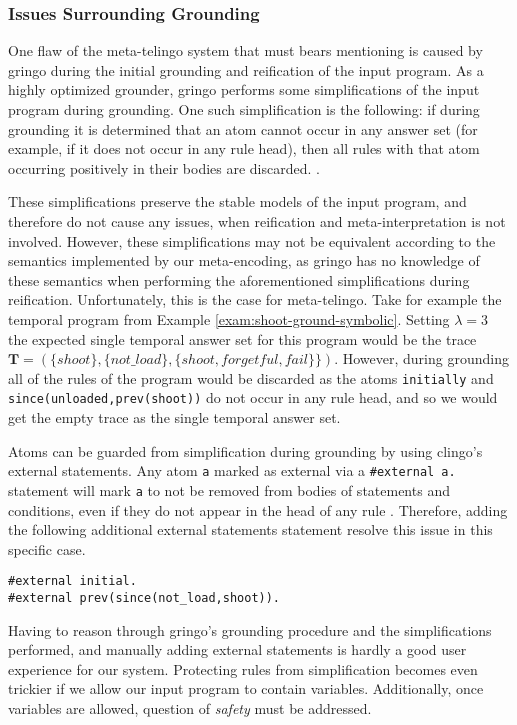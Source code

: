 \subsubsection{Issues Surrounding Grounding}

One flaw of the meta-telingo system that must bears mentioning is
caused by gringo during the initial grounding and reification of the
input program. As a highly optimized grounder, gringo performs some
simplifications of the input program during grounding. One such
simplification is the following: if during grounding it is determined
that an atom cannot occur in any answer set (for example, if it does
not occur in any rule head), then all rules with that atom occurring
positively in their bodies are discarded. \cite{gekakasc12a}.

These simplifications preserve the stable models of the input program,
and therefore do not cause any issues, when reification and
meta-interpretation is not involved. However, these simplifications
may not be equivalent according to the semantics implemented by our
meta-encoding, as gringo has no knowledge of these semantics when
performing the aforementioned simplifications during
reification. Unfortunately, this is the case for meta-telingo. Take
for example the temporal program from Example
\ref{exam:shoot-ground-symbolic}. Setting $\lambda=3$ the expected
single temporal answer set for this program would be the trace
$\bm{T}=(\{ shoot \}, \{ not\_load \}, \{ shoot, forgetful, fail \}
\})$. However, during grounding all of the rules of the program would
be discarded as the atoms \verb|initially| and
\verb|since(unloaded,prev(shoot))| do not occur in any rule head, and
so we would get the empty trace as the single temporal answer set.

Atoms can be guarded from simplification during grounding by using
clingo's external statements. Any atom \verb|a| marked as external via
a \verb|#external a.| statement will mark \verb|a| to not be removed
from bodies of statements and conditions, even if they do not appear
in the head of any rule \cite{PotasscoUserGuide19}. Therefore, adding
the following additional external statements statement resolve this
issue in this specific case.

\begin{lstlisting}[language=clingo,numbers=none]
#external initial.
#external prev(since(not_load,shoot)).
\end{lstlisting}

Having to reason through gringo's grounding procedure and the
simplifications performed, and manually adding external statements is
hardly a good user experience for our system. Protecting rules from
simplification becomes even trickier if we allow our input program to
contain variables. Additionally, once variables are allowed, question
of \emph{safety} must be addressed.

